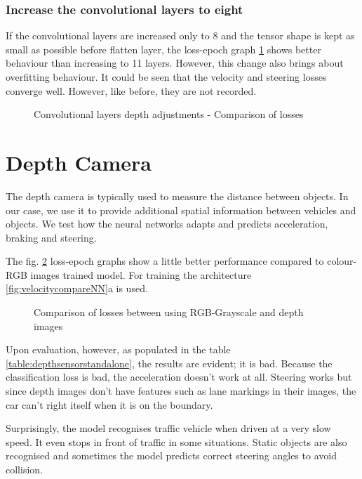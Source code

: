 \subsubsection*{Increase the convolutional layers to eight}
If the convolutional layers are increased only to 8 and the tensor shape is kept as small
as possible before flatten layer, the loss-epoch graph \ref{fig:convlayerslosses2} shows
better behaviour than increasing to 11 layers. However, this change also brings about
overfitting behaviour. It could be seen that the velocity and steering losses converge
well. However, like before, they are not recorded.
\begin{figure}[!ht]
    \centering
    \def\svgwidth{\textwidth}
    \caption{Convolutional layers depth adjustments - Comparison of losses}
    \label{fig:convlayerslosses2}
\end{figure}
\section{Depth Camera}
The depth camera is typically used to measure the distance between objects. In our case,
we use it to provide additional spatial information between vehicles and objects. We test
how the neural networks adapts and predicts acceleration, braking and steering.

The fig. \ref{fig:colourvsdepth1} loss-epoch graphs show a little better performance compared to
colour-RGB images trained model. For training the architecture
\ref{fig:velocitycompareNN}a is used.
\begin{figure}[!ht]
    \centering
    \def\svgwidth{\textwidth}
    \caption{Comparison of losses between using RGB-Grayscale and depth images}
    \label{fig:colourvsdepth1}
\end{figure}
Upon evaluation, however, as populated in the table \ref{table:depthsensorstandalone},
the results are evident; it is bad. Because the classification loss is bad, the
acceleration doesn't work at all. Steering works but since depth images don't have
features such as lane markings in their images, the car can't right itself when it is on
the boundary.

Surprisingly, the model recognises traffic vehicle when driven at a very slow speed. It
even stops in front of traffic in some situations. Static objects are also recognised and
sometimes the model predicts correct steering angles to avoid collision.

